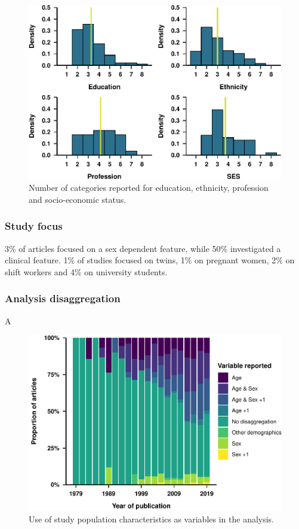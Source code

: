 \documentclass[
  english,
  jou,floatsintext]{apa6}
\begin{document}
\begin{figure}
\centering
\includegraphics{article_files/figure-latex/unnamed-chunk-11-1.pdf}
\caption{\label{fig:unnamed-chunk-11}Number of categories reported for education, ethnicity, profession and socio-economic status.}
\end{figure}

\hypertarget{study-focus}{%
\subsubsection{Study focus}\label{study-focus}}

3\% of articles focused on a sex dependent feature, while 50\% investigated a clinical feature. 1\% of studies focused on twins, 1\% on pregnant women, 2\% on shift workers and 4\% on university students.

\hypertarget{analysis-disaggregation}{%
\subsubsection{Analysis disaggregation}\label{analysis-disaggregation}}

A

\begin{figure}
\centering
\includegraphics{article_files/figure-latex/unnamed-chunk-12-1.pdf}
\caption{\label{fig:unnamed-chunk-12}Use of study population characteristics as variables in the analysis.}
\end{figure}
\end{document}
